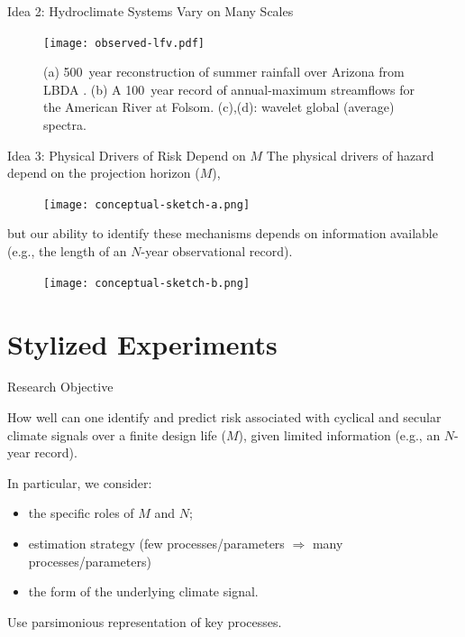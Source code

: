 \documentclass[
  10pt,     %
  handout   %
]{beamer}
\makeatletter
\newcommand*{\eg}{e.g.\@\xspace}
\makeatother
\begin{document}
\begin{frame}{Idea 2: Hydroclimate Systems Vary on Many Scales}
  \begin{figure}
    \centering
    \texttt{[image: observed-lfv.pdf]}
    \caption{
      (a) \SI{500}{year} reconstruction of summer rainfall over Arizona from LBDA \citep{Cook:2010bz}.
      (b) A \SI{100}{year} record of annual-maximum streamflows for the American River at Folsom.
      (c),(d): wavelet global (average) spectra.
    }\label{fig:observed-lfv}
  \end{figure}
\end{frame}

\begin{frame}{Idea 3: Physical Drivers of Risk Depend on $M$}
  The physical drivers of hazard depend on the projection horizon ($M$),
  \begin{figure}
    \centering
    \texttt{[image: conceptual-sketch-a.png]}\\
  \end{figure}
  \pause
  but our ability to identify these mechanisms depends on information available (\eg, the length of an $N$-year observational record).
  \begin{figure}
    \centering
    \texttt{[image: conceptual-sketch-b.png]}
  \end{figure}
\end{frame}

\section{Stylized Experiments}

\begin{frame}{Research Objective}
  \begin{alertblock}{How well can one identify and predict risk}
     associated with cyclical and secular climate signals over a finite design life ($M$),  given limited information (\eg, an $N$-year record).
  \end{alertblock}
  \pause
  In particular, we consider:
  \begin{itemize}
    \item the specific roles of $M$ and $N$;
    \pause
    \item estimation strategy (few processes/parameters $\Rightarrow$ many processes/parameters)
    \pause
    \item the form of the underlying climate signal.
  \end{itemize}
  \pause
  Use parsimonious representation of key processes.
\end{frame}
\end{document}

